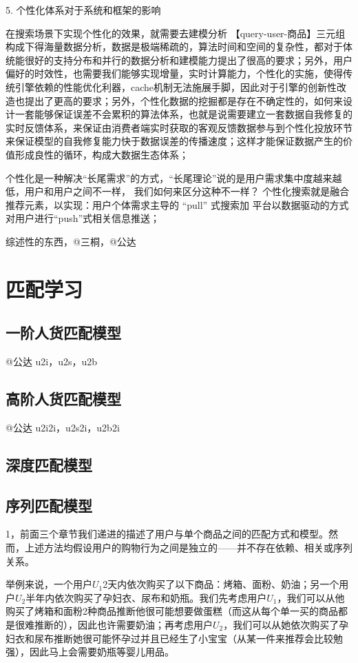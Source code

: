 5. 个性化体系对于系统和框架的影响

在搜索场景下实现个性化的效果，就需要去建模分析 【query-user-商品】三元组构成下得海量数据分析，数据是极端稀疏的，算法时间和空间的复杂性，都对于体统能很好的支持分布和并行的数据分析和建模能力提出了很高的要求；另外，用户偏好的时效性，也需要我们能够实现增量，实时计算能力，个性化的实施，使得传统引擎依赖的性能优化利器，cache机制无法施展手脚，因此对于引擎的创新性改造也提出了更高的要求；另外，个性化数据的挖掘都是存在不确定性的，如何来设计一套能够保证误差不会累积的算法体系，也就是说需要建立一套数据自我修复的实时反馈体系，来保证由消费者端实时获取的客观反馈数据参与到个性化投放环节来保证模型的自我修复能力快于数据误差的传播速度；这样才能保证数据产生的价值形成良性的循环，构成大数据生态体系；



个性化是一种解决“长尾需求”的方式，“长尾理论”说的是用户需求集中度越来越低，用户和用户之间不一样，
我们如何来区分这种不一样？ 个性化搜索就是融合推荐元素，以实现：用户个体需求主导的 “pull” 式搜索加
平台以数据驱动的方式对用户进行“push”式相关信息推送；


综述性的东西，@三桐，@公达

\section{匹配学习}
	
\subsection{一阶人货匹配模型} 
	@公达 u2i，u2s，u2b 

\subsection{高阶人货匹配模型} 
	@公达 u2i2i，u2s2i，u2b2i 

\subsection{深度匹配模型} 

\subsection{序列匹配模型} 
1，前面三个章节我们递进的描述了用户与单个商品之间的匹配方式和模型。然而，上述方法均假设用户的购物行为之间是独立的——并不存在依赖、相关或序列关系。

举例来说，一个用户$U_1$2天内依次购买了以下商品：烤箱、面粉、奶油；另一个用户$U_2$半年内依次购买了孕妇衣、尿布和奶瓶。我们先考虑用户$U_1$，我们可以从他购买了烤箱和面粉2种商品推断他很可能想要做蛋糕（而这从每个单一买的商品都是很难推断的），因此也许需要奶油；再考虑用户$U_2$，我们可以从她依次购买了孕妇衣和尿布推断她很可能怀孕过并且已经生了小宝宝（从某一件来推荐会比较勉强），因此马上会需要奶瓶等婴儿用品。

